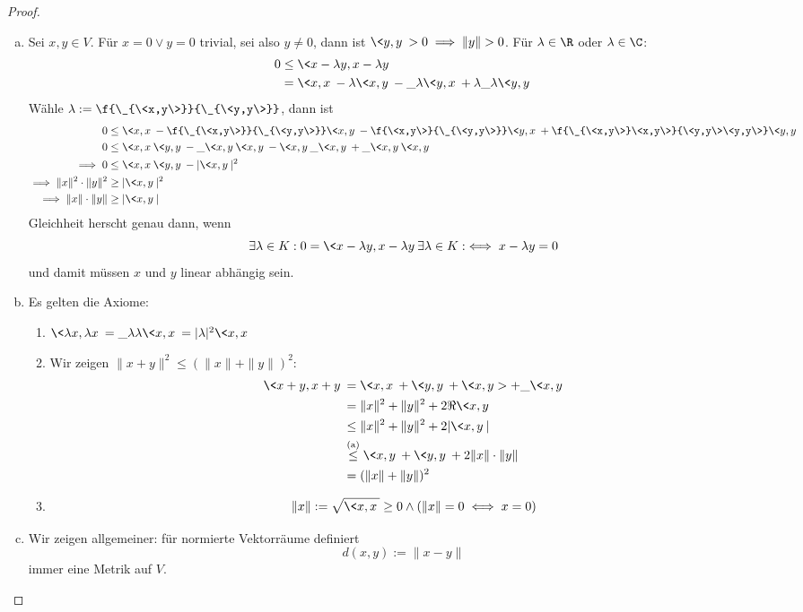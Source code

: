 \documentclass[a4paper, 10pt]{scrbook}
\begin{document}
\begin{thm}
	\begin{proof}
		\begin{enumerate}[(a)]
			\item
				Sei $x,y\in V$.
				Für $x=0 \lor y=0$ trivial, sei also $y\neq 0$, dann ist $\<y,y\> > 0 \implies \|y\|>0$.
				Für $\lambda\in \R$ oder $\lambda\in \C$:
				\begin{align*}
					0&\le \<x-\lambda y,x-\lambda y\> \\
					&= \<x,x\> - \lambda \<x,y\> - \_\lambda \<y,x\> + \lambda\_\lambda\<y,y\>
				\end{align*}
				Wähle $\lambda := \f {\_{\<x,y\>}}{\_{\<y,y\>}}$, dann ist
				\begin{align*}
					0&\le \<x,x\> - \f {\_{\<x,y\>}}{\_{\<y,y\>}} \<x,y\> - \f {\<x,y\>}{\_{\<y,y\>}}\<y,x\> + \f{\_{\<x,y\>}\<x,y\>}{\<y,y\>\<y,y\>} \<y,y\> \\
					0&\le \<x,x\>\<y,y\> - \_{\<x,y\>}\<x,y\> - \<x,y\>\_{\<x,y\>} + \_{\<x,y\>}\<x,y\> \\
					\implies 0 &\le \<x,x\>\<y,y\> - |\<x,y\>|^2\\
					\implies \|x\|^2\cdot \|y\|^2 &\ge |\<x,y\>|^2\\
					\implies \|x\|\cdot \|y\| &\ge |\<x,y\>|
				\end{align*}
				Gleichheit herscht genau dann, wenn
				\[
					\exists \lambda\in K : 0= \<x-\lambda y, x-\lambda y\> \exists \lambda\in K :\iff x-\lambda y = 0
				\]
				und damit müssen $x$ und $y$ linear abhängig sein.
			\item
				Es gelten die Axiome:
				\begin{enumerate}[({N}1)]
					\item $\<\lambda  x, \lambda x\> = \_{\lambda}\lambda \<x,x\> = |\lambda|^2\<x,x\>$
					\item
						Wir zeigen $\|x+y\|^2 \le (\|x\| + \|y\|)^2$:
						\begin{align*}
							\<x+y,x+y\> &= \<x,x\> + \<y,y\> + \<x,y> + \_{\<x,y\>}\\
										&= \|x\|^2 + \|y\|^2 + 2\Re \<x,y\>\\
							   &\le \|x\|^2 + \|y\|^2 + 2|\<x,y\>|\\
							   &\stackrel{\text{(a)}}\le  \<x,y\> + \<y,y\> + 2\|x\|\cdot \|y\| \\
							   &= (\|x\| + \|y\|)^2
						\end{align*}
					\item
						\[
							\|x\| := \sqrt{\<x,x\>} \ge 0 \land (\|x\|=0 \iff x=0)
						\]
				\end{enumerate}
			\item
				Wir zeigen allgemeiner: für normierte Vektorräume definiert
				\[
					d(x,y) := \|x-y\|
				\]
				immer eine Metrik auf $V$.


\end{enumerate}
\end{proof}
\end{thm}
\end{document}
